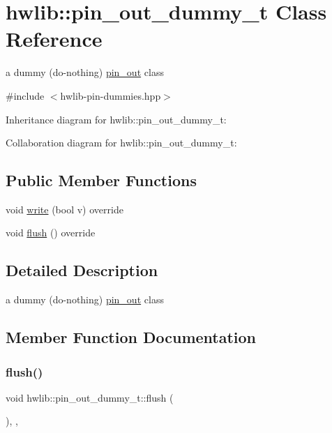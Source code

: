 \hypertarget{classhwlib_1_1pin__out__dummy__t}{}\section{hwlib\+:\+:pin\+\_\+out\+\_\+dummy\+\_\+t Class Reference}
\label{classhwlib_1_1pin__out__dummy__t}


a dummy (do-\/nothing) \hyperlink{classhwlib_1_1pin__out}{pin\+\_\+out} class  




{\ttfamily \#include $<$hwlib-\/pin-\/dummies.\+hpp$>$}



Inheritance diagram for hwlib\+:\+:pin\+\_\+out\+\_\+dummy\+\_\+t\+:


Collaboration diagram for hwlib\+:\+:pin\+\_\+out\+\_\+dummy\+\_\+t\+:
\subsection*{Public Member Functions}
\begin{DoxyCompactItemize}
\item 
void \hyperlink{classhwlib_1_1pin__out__dummy__t_a155ff6021cfacdbed10f34ec1aef1630}{write} (bool v) override
\item 
void \hyperlink{classhwlib_1_1pin__out__dummy__t_ac8513bd390f0315c544f8c2e299df3d6}{flush} () override
\end{DoxyCompactItemize}


\subsection{Detailed Description}
a dummy (do-\/nothing) \hyperlink{classhwlib_1_1pin__out}{pin\+\_\+out} class 

\subsection{Member Function Documentation}
\mbox{\label{classhwlib_1_1pin__out__dummy__t_ac8513bd390f0315c544f8c2e299df3d6}} 
\subsubsection{\texorpdfstring{flush()}{flush()}}
{\footnotesize\ttfamily void hwlib\+::pin\+\_\+out\+\_\+dummy\+\_\+t\+::flush (\begin{DoxyParamCaption}{ }\end{DoxyParamCaption})\hspace{0.3cm}{\ttfamily [inline]}, {\ttfamily [override]}, {\ttfamily [virtual]}}





